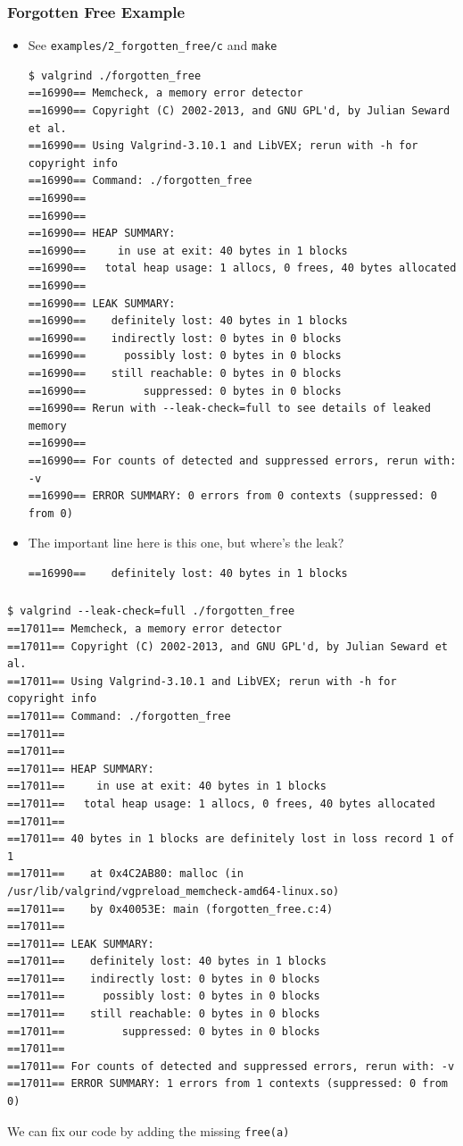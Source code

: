 \documentclass{beamer}
\begin{document}
\begin{frame}[fragile]
  \frametitle{Forgotten Free Example} 
  \begin{itemize}
    \item See \texttt{examples/2\_forgotten\_free/c} and \texttt{make}
  \begin{lstlisting}
$ valgrind ./forgotten_free
==16990== Memcheck, a memory error detector
==16990== Copyright (C) 2002-2013, and GNU GPL'd, by Julian Seward et al.
==16990== Using Valgrind-3.10.1 and LibVEX; rerun with -h for copyright info
==16990== Command: ./forgotten_free
==16990==
==16990==
==16990== HEAP SUMMARY:
==16990==     in use at exit: 40 bytes in 1 blocks
==16990==   total heap usage: 1 allocs, 0 frees, 40 bytes allocated
==16990==
==16990== LEAK SUMMARY:
==16990==    definitely lost: 40 bytes in 1 blocks
==16990==    indirectly lost: 0 bytes in 0 blocks
==16990==      possibly lost: 0 bytes in 0 blocks
==16990==    still reachable: 0 bytes in 0 blocks
==16990==         suppressed: 0 bytes in 0 blocks
==16990== Rerun with --leak-check=full to see details of leaked memory
==16990==
==16990== For counts of detected and suppressed errors, rerun with: -v
==16990== ERROR SUMMARY: 0 errors from 0 contexts (suppressed: 0 from 0)
  \end{lstlisting}
\item The important line here is this one, but where's the leak?
\begin{lstlisting}
==16990==    definitely lost: 40 bytes in 1 blocks
\end{lstlisting}
\end{itemize}
\end{frame}

\begin{frame}[fragile]
  \frametitle{}
  \begin{lstlisting}
$ valgrind --leak-check=full ./forgotten_free
==17011== Memcheck, a memory error detector
==17011== Copyright (C) 2002-2013, and GNU GPL'd, by Julian Seward et al.
==17011== Using Valgrind-3.10.1 and LibVEX; rerun with -h for copyright info
==17011== Command: ./forgotten_free
==17011==
==17011==
==17011== HEAP SUMMARY:
==17011==     in use at exit: 40 bytes in 1 blocks
==17011==   total heap usage: 1 allocs, 0 frees, 40 bytes allocated
==17011==
==17011== 40 bytes in 1 blocks are definitely lost in loss record 1 of 1
==17011==    at 0x4C2AB80: malloc (in /usr/lib/valgrind/vgpreload_memcheck-amd64-linux.so)
==17011==    by 0x40053E: main (forgotten_free.c:4)
==17011==
==17011== LEAK SUMMARY:
==17011==    definitely lost: 40 bytes in 1 blocks
==17011==    indirectly lost: 0 bytes in 0 blocks
==17011==      possibly lost: 0 bytes in 0 blocks
==17011==    still reachable: 0 bytes in 0 blocks
==17011==         suppressed: 0 bytes in 0 blocks
==17011==
==17011== For counts of detected and suppressed errors, rerun with: -v
==17011== ERROR SUMMARY: 1 errors from 1 contexts (suppressed: 0 from 0)
  \end{lstlisting}

  We can fix our code by adding the missing \lstinline{free(a)}

\end{frame}
\end{document}

